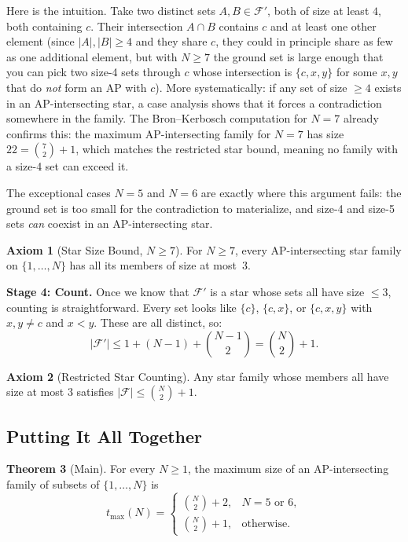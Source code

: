 \documentclass[11pt,a4paper]{article}
\theoremstyle{definition}
\newtheorem{theorem}{Theorem}[section]
\newtheorem{axiom}[theorem]{Axiom}
\newcommand{\CN}{\binom{N}{2}}
\newcommand{\ground}{\{1,\dots,N\}}
\begin{document}
Here is the intuition. Take two distinct sets $A, B \in \mathcal{F}'$, both of size
at least $4$, both containing $c$. Their intersection $A \cap B$ contains $c$ and at
least one other element (since $|A|, |B| \geq 4$ and they share $c$, they could in
principle share as few as one additional element, but with $N \geq 7$ the ground set
is large enough that you can pick two size-4 sets through $c$ whose intersection is
$\{c, x, y\}$ for some $x,y$ that do \emph{not} form an AP with $c$). More
systematically: if any set of size $\geq 4$ exists in an AP-intersecting star, a case
analysis shows that it forces a contradiction somewhere in the family. The Bron--Kerbosch
computation for $N=7$ already confirms this: the maximum AP-intersecting family for
$N=7$ has size $22 = \binom{7}{2} + 1$, which matches the restricted star bound,
meaning no family with a size-4 set can exceed it.

The exceptional cases $N=5$ and $N=6$ are exactly where this argument fails: the
ground set is too small for the contradiction to materialize, and size-4 and size-5
sets \emph{can} coexist in an AP-intersecting star.

\begin{axiom}[Star Size Bound, $N \geq 7$]\label{ax:sizebd}
For $N \geq 7$, every AP-intersecting star family on $\ground$ has all its members
of size at most~$3$.
\end{axiom}

\medskip\noindent
\textbf{Stage 4: Count.} Once we know that $\mathcal{F}'$ is a star whose sets all
have size $\leq 3$, counting is straightforward. Every set looks like $\{c\}$,
$\{c,x\}$, or $\{c,x,y\}$ with $x,y \neq c$ and $x < y$. These are all distinct, so:
\[
|\mathcal{F}'| \leq 1 + (N-1) + \binom{N-1}{2} = \binom{N}{2} + 1.
\]

\begin{axiom}[Restricted Star Counting]\label{ax:starcnt}
Any star family whose members all have size at most $3$ satisfies
$|\mathcal{F}| \leq \CN + 1$.
\end{axiom}


\subsection{Putting It All Together}

\begin{theorem}[Main]
For every $N \geq 1$, the maximum size of an AP-intersecting family of subsets of
$\{1,\dots,N\}$ is
\[
t_{\max}(N) = \begin{cases}
\binom{N}{2} + 2, & N = 5 \text{ or } 6,\\[6pt]
\binom{N}{2} + 1, & \text{otherwise}.
\end{cases}
\]
\end{theorem}
\end{document}

